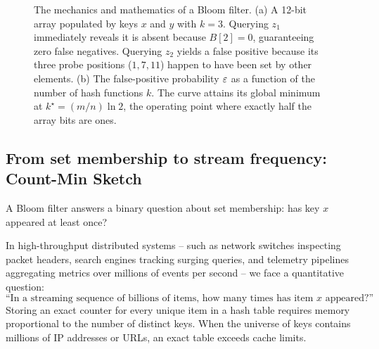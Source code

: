 \begin{figure}[htbp]
\caption{The mechanics and mathematics of a Bloom filter. (a) A 12-bit array populated by keys $x$ and $y$ with $k=3$. Querying $z_1$ immediately reveals it is absent because $B[2] = 0$, guaranteeing zero false negatives. Querying $z_2$ yields a false positive because its three probe positions ($1, 7, 11$) happen to have been set by other elements. (b) The false-positive probability $\varepsilon$ as a function of the number of hash functions $k$. The curve attains its global minimum at $k^\star = (m/n)\ln 2$, the operating point where exactly half the array bits are ones.}
\label{ch11:fig-bloom-filter}
\end{figure}

\subsection{From set membership to stream frequency: Count-Min Sketch}

A Bloom filter answers a binary question about set membership: has key $x$ appeared at least once?

In high-throughput distributed systems -- such as network switches inspecting packet headers, search engines tracking surging queries, and telemetry pipelines aggregating metrics over millions of events per second -- we face a quantitative question:
\[
  \text{``In a streaming sequence of billions of items, how many times has item } x \text{ appeared?''}
\]
Storing an exact counter for every unique item in a hash table requires memory proportional to the number of distinct keys. When the universe of keys contains millions of IP addresses or URLs, an exact table exceeds cache limits.

